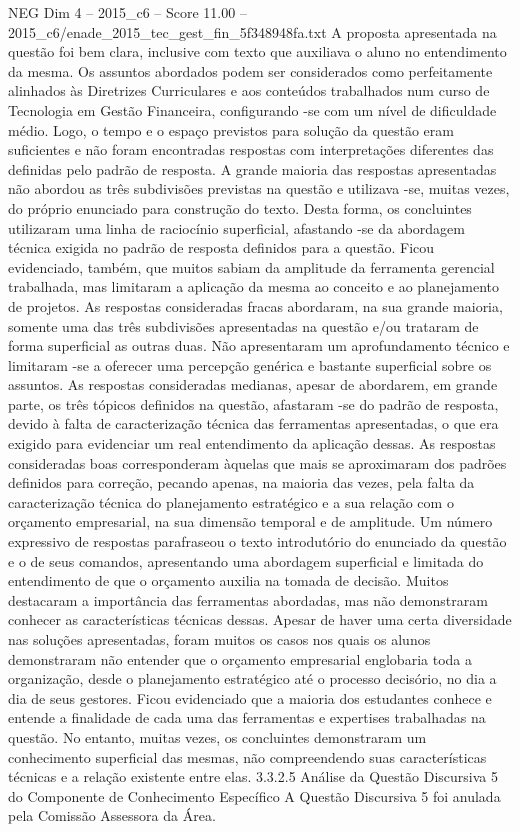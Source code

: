 \begin{textsample}{NEG Dim 4 – 2015\_c6 – Score 11.00 – 2015\_c6/enade\_2015\_tec\_gest\_fin\_5f348948fa.txt}
A proposta apresentada na questão foi bem clara, inclusive com texto que auxiliava o aluno no entendimento da mesma.
Os assuntos abordados podem ser considerados como perfeitamente alinhados às Diretrizes Curriculares e aos conteúdos trabalhados num curso de Tecnologia em Gestão Financeira, configurando -se com um nível de dificuldade médio.
Logo, o tempo e o espaço previstos para solução da questão eram suficientes e não foram encontradas respostas com interpretações diferentes das definidas pelo padrão de resposta.
A grande maioria das respostas apresentadas não abordou as três subdivisões previstas na questão e utilizava -se, muitas vezes, do próprio enunciado para construção do texto.
Desta forma, os concluintes utilizaram uma linha de raciocínio superficial, afastando -se da abordagem técnica exigida no padrão de resposta definidos para a questão.
Ficou evidenciado, também, que muitos sabiam da amplitude da ferramenta gerencial trabalhada, mas limitaram a aplicação da mesma ao conceito e ao planejamento de projetos.
As respostas consideradas fracas abordaram, na sua grande maioria, somente uma das três subdivisões apresentadas na questão e/ou trataram de forma superficial as outras duas.
Não apresentaram um aprofundamento técnico e limitaram -se a oferecer uma percepção genérica e bastante superficial sobre os assuntos.
As respostas consideradas medianas, apesar de abordarem, em grande parte, os três tópicos definidos na questão, afastaram -se do padrão de resposta, devido à falta de caracterização técnica das ferramentas apresentadas, o que era exigido para evidenciar um real entendimento da aplicação dessas.
As respostas consideradas boas corresponderam àquelas que mais se aproximaram dos padrões definidos para correção, pecando apenas, na maioria das vezes, pela falta da caracterização técnica do planejamento estratégico e a sua relação com o orçamento empresarial, na sua dimensão temporal e de amplitude.
Um número expressivo de respostas parafraseou o texto introdutório do enunciado da questão e o de seus comandos, apresentando uma abordagem superficial e limitada do entendimento de que o orçamento auxilia na tomada de decisão.
Muitos destacaram a importância das ferramentas abordadas, mas não demonstraram conhecer as características técnicas dessas.
Apesar de haver uma certa diversidade nas soluções apresentadas, foram muitos os casos nos quais os alunos demonstraram não entender que o orçamento empresarial englobaria toda a organização, desde o planejamento estratégico até o processo decisório, no dia a dia de seus gestores.
Ficou evidenciado que a maioria dos estudantes conhece e entende a finalidade de cada uma das ferramentas e expertises trabalhadas na questão.
No entanto, muitas vezes, os concluintes demonstraram um conhecimento superficial das mesmas, não compreendendo suas características técnicas e a relação existente entre elas. 3.3.2.5 Análise da Questão Discursiva 5 do Componente de Conhecimento Específico A Questão Discursiva 5 foi anulada pela Comissão Assessora da Área.

\end{textsample}
